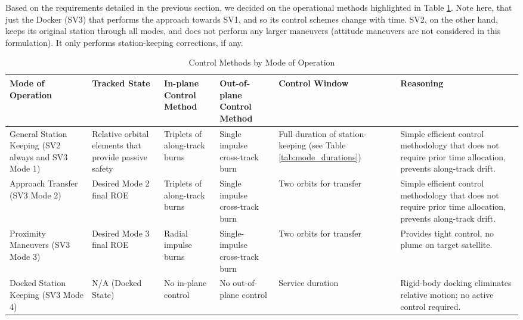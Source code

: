 Based on the requirements detailed in the previous section, we decided on the operational methods highlighted in Table \ref{tab:mode_control_methods}. Note here, that just the Docker (SV3) that performs the approach towards SV1, and so its control schemes change with time. SV2, on the other hand, keeps its original station through all modes, and does not perform any larger maneuvers (attitude maneuvers are not considered in this formulation). It only performs station-keeping corrections, if any.


\begin{table}[H]
    \centering
    \caption{Control Methods by Mode of Operation}
    \renewcommand{\arraystretch}{1.3}

    \begin{tabularx}{\textwidth}{|>{\raggedright\arraybackslash}p{}|%
                                      >{\raggedright\arraybackslash}p{}|%
                                      >{\raggedright\arraybackslash}p{}|%
                                      >{\raggedright\arraybackslash}p{}|%
                                      >{\raggedright\arraybackslash}p{}|%
                                      >{\raggedright\arraybackslash}X|}
        \rowcolor{lightgray}
        \hline
        \textbf{Mode of Operation} & \textbf{Tracked State} & \textbf{In-plane Control Method} & \textbf{Out-of-plane Control Method} & \textbf{Control Window} & \textbf{Reasoning} \\
        \hline
        General Station Keeping (SV2 always and SV3 Mode 1) & Relative orbital elements that provide passive safety & Triplets of along-track burns & Single impulse cross-track burn & Full duration of station-keeping (see Table \ref{tab:mode_durations}) & Simple efficient control methodology that does not require prior time allocation, prevents along-track drift. \\
        \hline
        Approach Transfer (SV3 Mode 2) & Desired Mode 2 final ROE & Triplets of along-track burns & Single impulse cross-track burn & Two orbits for transfer & Simple efficient control methodology that does not require prior time allocation, prevents along-track drift. \\
        \hline
        Proximity Maneuvers (SV3 Mode 3) & Desired Mode 3 final ROE & Radial impulse burns & Single-impulse cross-track burn & Two orbits for transfer & Provides tight control, no plume on target satellite. \\
        \hline
        Docked Station Keeping (SV3 Mode 4) & N/A (Docked State) & No in-plane control & No out-of-plane control & Service duration & Rigid-body docking eliminates relative motion; no active control required. \\
        \hline
    \end{tabularx}
    \label{tab:mode_control_methods}
\end{table}



